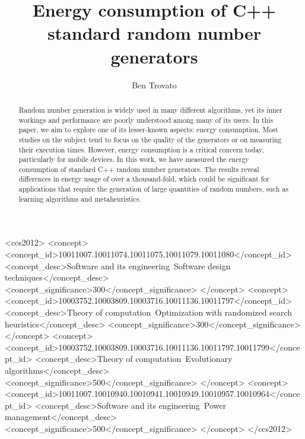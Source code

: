 \documentclass[dvipsnames,format=sigconf,anonymous=true,review=true]{acmart}
\begin{document}
\title{Energy consumption of C++ standard random number generators}

\author{Ben Trovato}


\begin{abstract}
  Random number generation is widely used in many different algorithms, yet its inner workings and performance are poorly understood among many of its users. In this paper, we aim to explore one of its lesser-known aspects: energy consumption. Most studies on the subject tend to focus on the quality of the generators or on measuring their execution times. However, energy consumption is a critical concern today, particularly for mobile devices. In this work, we have measured the energy consumption of standard C++ random number generators. The results reveal differences in energy usage of over a thousand-fold, which could be significant for applications that require the generation of large quantities of random numbers, such as learning algorithms and metaheuristics.
\end{abstract}

%
%
\begin{CCSXML}
<ccs2012>
   <concept>
       <concept_id>10011007.10011074.10011075.10011079.10011080</concept_id>
       <concept_desc>Software and its engineering~Software design techniques</concept_desc>
       <concept_significance>300</concept_significance>
       </concept>
   <concept>
       <concept_id>10003752.10003809.10003716.10011136.10011797</concept_id>
       <concept_desc>Theory of computation~Optimization with randomized search heuristics</concept_desc>
       <concept_significance>300</concept_significance>
       </concept>
   <concept>
       <concept_id>10003752.10003809.10003716.10011136.10011797.10011799</concept_id>
       <concept_desc>Theory of computation~Evolutionary algorithms</concept_desc>
       <concept_significance>500</concept_significance>
       </concept>
   <concept>
       <concept_id>10011007.10010940.10010941.10010949.10010957.10010964</concept_id>
       <concept_desc>Software and its engineering~Power management</concept_desc>
       <concept_significance>500</concept_significance>
       </concept>
 </ccs2012>
\end{CCSXML}
\end{document}
